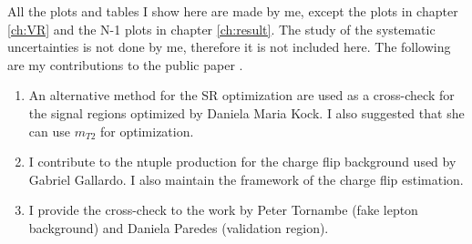All the plots and tables I show here are made by me, except the plots in chapter \ref{ch:VR} and the N-1 plots in chapter \ref{ch:result}.
The study of the systematic uncertainties is not done by me, therefore it is not included here.
The following are my contributions to the public paper \cite{Wh} \cite{WhSS}.
\begin{enumerate}
\item An alternative method for the SR optimization are used as a cross-check for the signal regions optimized by Daniela Maria Kock. I also suggested that she can use $m_{T2}$ for optimization.
\item I contribute to the ntuple production for the charge flip background used by Gabriel Gallardo. I also maintain the framework of the charge flip estimation.
\item I provide the cross-check to the work by Peter Tornambe (fake lepton background) and Daniela Paredes (validation region).
\end{enumerate}
